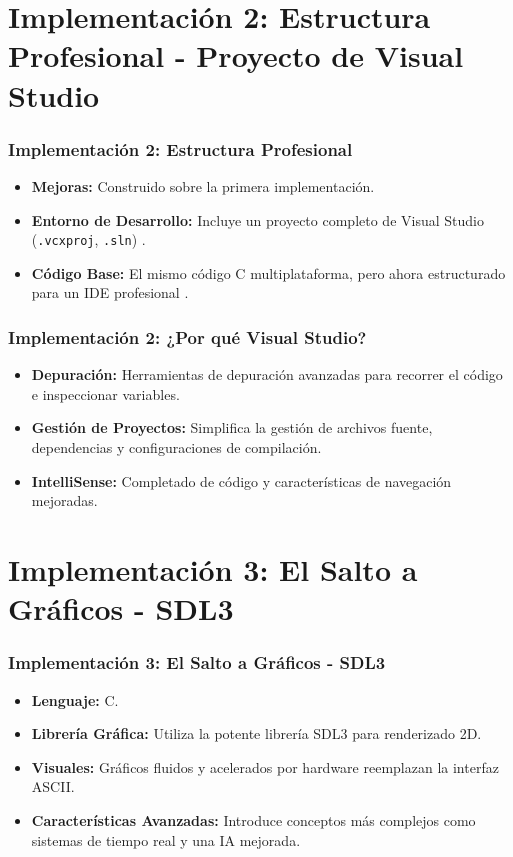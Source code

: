\documentclass[]{beamer}
\begin{document}
\section{Implementación 2: Estructura Profesional - Proyecto de Visual Studio}
\begin{frame}
  \frametitle{Implementación 2: Estructura Profesional}
  \subtitle{\texttt{02-simple-visual-studio}: Organizado para el Desarrollo}
  \begin{itemize}
    \item \textbf{Mejoras:} Construido sobre la primera implementación.
    \item \textbf{Entorno de Desarrollo:} Incluye un proyecto completo de Visual Studio (\texttt{.vcxproj}, \texttt{.sln}) \cite{pong_vs_project, pong_vs_solution}.
    \item \textbf{Código Base:} El mismo código C multiplataforma, pero ahora estructurado para un IDE profesional \cite{pong_vs_main}.
  \end{itemize}
\end{frame}

\begin{frame}
  \frametitle{Implementación 2: ¿Por qué Visual Studio?}
  \begin{itemize}
    \item \textbf{Depuración:} Herramientas de depuración avanzadas para recorrer el código e inspeccionar variables.
    \item \textbf{Gestión de Proyectos:} Simplifica la gestión de archivos fuente, dependencias y configuraciones de compilación.
    \item \textbf{IntelliSense:} Completado de código y características de navegación mejoradas.
  \end{itemize}
\end{frame}

\section{Implementación 3: El Salto a Gráficos - SDL3}
\begin{frame}
  \frametitle{Implementación 3: El Salto a Gráficos - SDL3}
  \subtitle{\texttt{03-simple-visual-studio-sdl}: Un Enfoque Moderno}
  \begin{itemize}
    \item \textbf{Lenguaje:} C.
    \item \textbf{Librería Gráfica:} Utiliza la potente librería SDL3 para renderizado 2D.
    \item \textbf{Visuales:} Gráficos fluidos y acelerados por hardware reemplazan la interfaz ASCII.
    \item \textbf{Características Avanzadas:} Introduce conceptos más complejos como sistemas de tiempo real y una IA mejorada.
  \end{itemize}
\end{frame}
\end{document}
